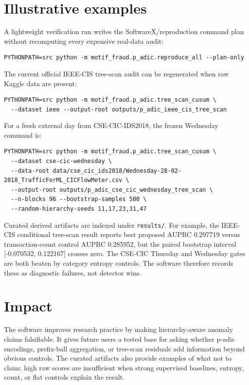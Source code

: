 \documentclass[preprint,12pt,a4paper]{elsarticle}
\begin{document}
\section{Illustrative examples}
A lightweight verification run writes the SoftwareX/reproduction command plan without recomputing every expensive real-data audit:
\begin{verbatim}
PYTHONPATH=src python -m motif_fraud.p_adic.reproduce_all --plan-only
\end{verbatim}

The current official IEEE-CIS tree-scan audit can be regenerated when raw Kaggle data are present:
\begin{verbatim}
PYTHONPATH=src python -m motif_fraud.p_adic.tree_scan_cusum \
  --dataset ieee --output-root outputs/p_adic_ieee_cis_tree_scan
\end{verbatim}

For a fresh external day from CSE-CIC-IDS2018, the frozen Wednesday command is:
\begin{verbatim}
PYTHONPATH=src python -m motif_fraud.p_adic.tree_scan_cusum \
  --dataset cse-cic-wednesday \
  --data-root data/cse_cic_ids2018/Wednesday-28-02-2018_TrafficForML_CICFlowMeter.csv \
  --output-root outputs/p_adic_cse_cic_wednesday_tree_scan \
  --n-blocks 96 --bootstrap-samples 500 \
  --random-hierarchy-seeds 11,17,23,31,47
\end{verbatim}

Curated derived artifacts are indexed under \texttt{results/}. For example, the IEEE-CIS conditional tree-scan result reports best proposed AUPRC 0.297719 versus transaction-count control AUPRC 0.285952, but the paired bootstrap interval [-0.070532, 0.122167] crosses zero. The CSE-CIC Thursday and Wednesday gates are both beaten by category entropy controls. The software therefore records these as diagnostic failures, not detector wins.

\section{Impact}
The software improves research practice by making hierarchy-aware anomaly claims falsifiable. It gives future users a tested base for asking whether p-adic encodings, prefix-ball aggregation, or tree-scan residuals add information beyond obvious controls. The curated artifacts also provide examples of what not to claim: high raw scores are insufficient when strong supervised baselines, entropy, count, or flat controls explain the result.
\end{document}
